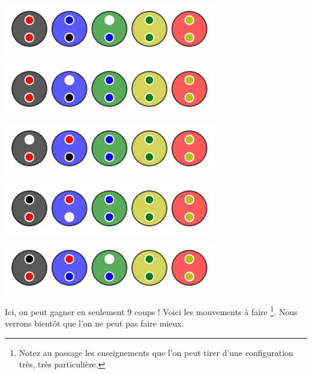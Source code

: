 \begin{multicols}{2}
	\columnbreak
	\begin{center}   %
		\includegraphics[scale= 0.45]{content/optimal/where_do_we_go/algo_bubble/005.png}

		\includegraphics[scale= 0.45]{content/optimal/where_do_we_go/algo_bubble/006.png}

		\includegraphics[scale= 0.45]{content/optimal/where_do_we_go/algo_bubble/007.png}

		\includegraphics[scale= 0.45]{content/optimal/where_do_we_go/algo_bubble/008.png}

		\includegraphics[scale= 0.45]{content/optimal/where_do_we_go/algo_bubble/009.png}
	\end{center}
\end{multicols}


\medskip

Ici, on peut gagner en seulement 9 coups ! Voici les mouvements à faire
\footnote{
	Notez au passage les enseignements que l'on peut tirer d'une configuration très, très particulière.
}.
Nous verrons bientôt que l'on ne peut pas faire mieux.

